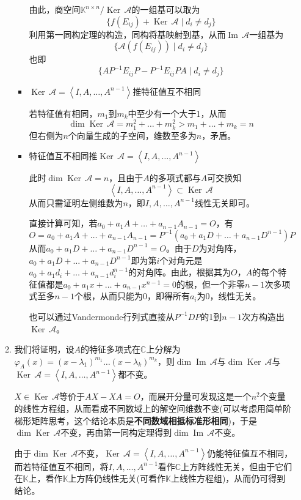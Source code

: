 \documentclass[a4paper,UTF8,fontset=windows,AutoFakeBold]{ctexart}
\DeclareMathOperator{\im}{Im\,}
\DeclareMathOperator{\Ker}{Ker\,}
\newcommand*{\ma}{\mathcal{A}}
\newcommand*{\note}{\noindent *}
\begin{document}
\begin{enumerate}
\begin{enumerate}
\begin{itemize}
            由此，商空间$\mathbb{K}^{n\times n}/\Ker\ma$的一组基可以取为
            $$\{f(E_{ij})+\Ker\ma\mid d_i\ne d_j\}$$
            利用第一同构定理的构造，同构将基映射到基，从而$\im\ma$一组基为
            $$\{\ma(f(E_{ij}))\mid d_i\ne d_j\}$$
            也即
            $$\{AP^{-1}E_{ij}P-P^{-1}E_{ij}PA\mid d_i\ne d_j\}$$

            \item $\Ker\ma=\left<I,A,\dots,A^{n-1}\right>$推特征值互不相同
            
            若特征值有相同，$m_1$到$m_k$中至少有一个大于1，从而
            $$\dim\Ker\ma=m_1^2+\dots+m_k^2>m_1+\dots+m_k=n$$
            但右侧为$n$个向量生成的子空间，维数至多为$n$，矛盾。

            \item 特征值互不相同推$\Ker\ma=\left<I,A,\dots,A^{n-1}\right>$
            
            此时$\dim\Ker\ma=n$，且由于$A$的多项式都与$A$可交换知
            $$\left<I,A,\dots,A^{n-1}\right>\subset\Ker\ma$$
            从而只需证明左侧维数为$n$，即$I,A,\dots,A^{n-1}$线性无关即可。

            直接计算可知，若$a_0+a_1A+\dots+a_{n-1}A_{n-1}=O$，有
            $$O=a_0+a_1A+\dots+a_{n-1}A_{n-1}=P^{-1}(a_0+a_1D+\dots+a_{n-1}D^{n-1})P$$
            从而$a_0+a_1D+\dots+a_{n-1}D^{n-1}=O$。由于$D$为对角阵，$a_0+a_1D+\dots+a_{n-1}D^{n-1}$即为第$i$个对角元是$a_0+a_1d_i+\dots+a_{n-1}d_i^{n-1}$的对角阵。由此，根据其为$O$，$A$的每个特征值都是$a_0+a_1x+\dots+a_{n-1}x^{n-1}=0$的根，但一个非零$n-1$次多项式至多$n-1$个根，从而只能为0，即得所有$a_i$为0，线性无关。

            \note 也可以通过Vandermonde行列式直接从$P^{-1}DP$的1到$n-1$次方构造出$\Ker\ma$。
        \end{itemize}
        
        \item 
        我们将证明，设$A$的特征多项式在$\mathbb{C}$上分解为$\varphi_A(x)=(x-\lambda_1)^{m_1}\dots(x-\lambda_k)^{m_k}$，则$\dim\im\ma$与$\dim\Ker\ma$与$\Ker\ma=\left<I,A,\dots,A^{n-1}\right>$都不变。

        $X\in\Ker\ma$等价于$AX-XA=O$，而展开分量可发现这是一个$n^2$个变量的线性方程组，从而看成不同数域上的解空间维数不变(可以考虑用简单阶梯形矩阵思考，这个结论本质是\textbf{不同数域相抵标准形相同})，于是$\dim\Ker\ma$不变，再由第一同构定理得到$\dim\im\ma$不变。

        由于$\dim\Ker\ma$不变，$\Ker\ma=\left<I,A,\dots,A^{n-1}\right>$仍能特征值互不相同，而若特征值互不相同，将$I,A,\dots,A^{n-1}$看作$\mathbb{C}$上方阵线性无关，但由于它们在$\mathbb{K}$上，看作$\mathbb{K}$上方阵仍线性无关(可看作$\mathbb{K}$上线性方程组)，从而仍可得到结论。
    \end{enumerate}
    

\end{enumerate}
\end{document}
